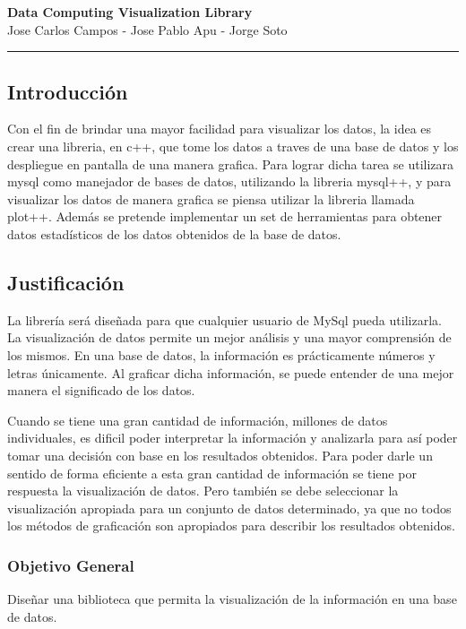 \documentclass[11pt]{article}
\begin{document}
\begin{center}
{ \huge \bfseries Data Computing Visualization Library }\\[0.2cm]
{ Jose Carlos Campos - Jose Pablo Apu - Jorge Soto }\\[0.2cm]
\rule{\linewidth}{0.25mm}
\end{center}

\subsection*{Introducción}
Con el fin de brindar una mayor facilidad para visualizar los datos, la idea es crear una libreria, en c++, 
que tome los datos a traves de una base de datos y los despliegue en pantalla de una manera grafica. 
Para lograr dicha tarea se utilizara mysql como manejador de bases de datos, utilizando la libreria mysql++, 
y para visualizar los datos de manera grafica se piensa utilizar la libreria llamada plot++. 
Además se pretende implementar un set de herramientas para obtener datos estadísticos de los datos obtenidos de la base de datos. 

\subsection*{Justificación}
La librería será diseñada para que cualquier usuario de MySql pueda utilizarla. La visualización de datos 
permite un mejor análisis y una mayor comprensión de los mismos. En una base de datos, la información es 
prácticamente números y letras únicamente. Al graficar dicha información, se puede entender de una mejor
manera el significado de los datos.

Cuando se tiene una gran cantidad de información, millones de datos individuales, es dificil poder interpretar la información
y analizarla para así poder tomar una decisión con base en los resultados obtenidos. Para poder darle un sentido de forma eficiente a esta
gran cantidad de información se tiene por respuesta la visualización de datos. Pero también se debe seleccionar la visualización
apropiada para un conjunto de datos determinado, ya que no todos los métodos de graficación son apropiados para describir
los resultados obtenidos.\cite{oreilly} 

\subsubsection*{Objetivo General}
Diseñar una biblioteca que permita la visualización de la información en una base de datos.
\end{document}
